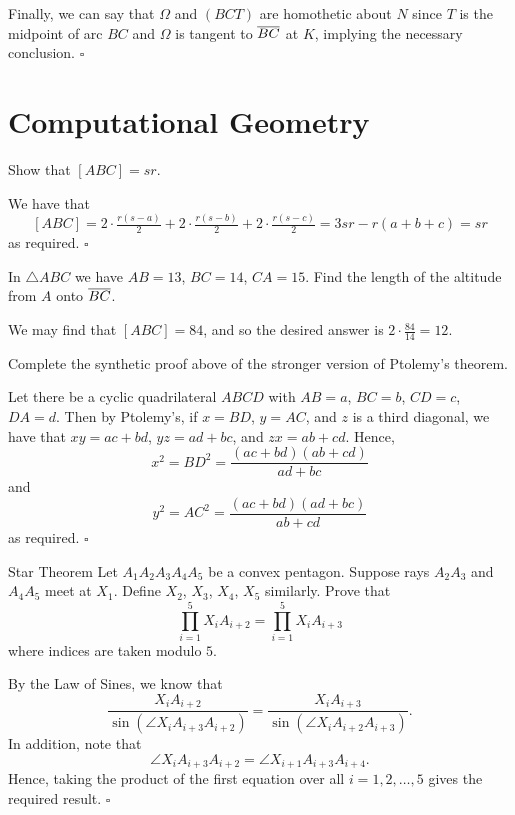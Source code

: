 \documentclass{article}
\begin{document}
Finally, we can say that $\Omega$ and $(BCT)$ are homothetic about $N$ since $T$ is the midpoint of arc $BC$ and $\Omega$ is tangent to $\overline{BC}$ at $K$, implying the necessary conclusion. $\square$

\newpage

\section{Computational Geometry}

\begin{problem}[5.5]{}
Show that $[ABC] = sr$.
\end{problem}

We have that \[[ABC] = 2\cdot\tfrac{r(s-a)}{2}+2\cdot\tfrac{r(s-b)}{2}+2\cdot\tfrac{r(s-c)}{2} = 3sr-r(a+b+c)=sr\] as required. $\square$

\begin{problem}[5.6]{}
In $\triangle ABC$ we have $AB = 13$, $BC = 14$, $CA = 15$. Find the length of the altitude from $A$ onto $\overline{BC}$.
\end{problem}

We may find that $[ABC] = 84$, and so the desired answer is $2\cdot \tfrac{84}{14} = \boxed{12}$.

\begin{problem}[5.12]{}
Complete the synthetic proof above of the stronger version of Ptolemy’s theorem.
\end{problem}

Let there be a cyclic quadrilateral $ABCD$ with $AB = a$, $BC = b$, $CD = c$, $DA = d$. Then by Ptolemy's, if $x = BD$, $y = AC$, and $z$ is a third diagonal, we have that $xy = ac + bd$, $yz = ad + bc$, and $zx = ab + cd$. Hence, \[x^2 = BD^2 = \dfrac{(ac+bd)(ab+cd)}{ad+bc}\] and \[y^2 = AC^2 = \dfrac{(ac+bd)(ad+bc)}{ab+cd}\] as required. $\square$

\begin{problem}[5.16]{Star Theorem}
Let $A_1A_2A_3A_4A_5$ be a convex pentagon. Suppose rays $A_2A_3$ and $A_4A_5$ meet at $X_1$. Define $X_2$, $X_3$, $X_4$, $X_5$ similarly. Prove that \[\prod_{i=1}^5 X_iA_{i+2} = \prod_{i=1}^5 X_iA_{i+3}\] where indices are taken modulo $5$.
\end{problem}

By the Law of Sines, we know that \[\dfrac{X_iA_{i+2}}{\sin(\angle X_iA_{i+3}A_{i+2})} = \dfrac{X_iA_{i+3}}{\sin(\angle X_iA_{i+2}A_{i+3})}.\] In addition, note that \[\angle X_iA_{i+3}A_{i+2} = \angle X_{i+1}A_{i+3}A_{i+4}.\] Hence, taking the product of the first equation over all $i = 1, 2, \dots, 5$ gives the required result. $\square$
\end{document}
